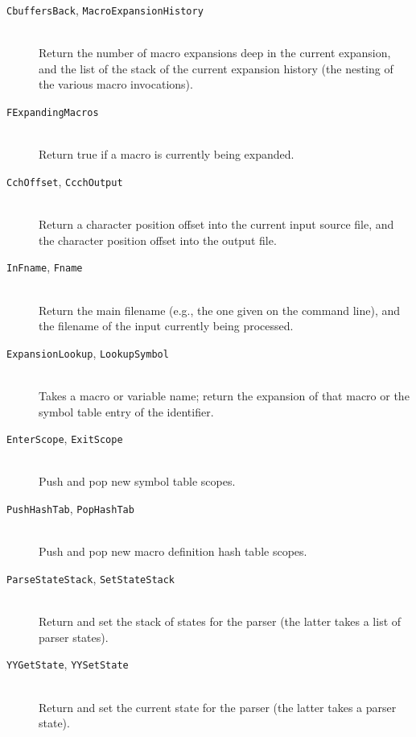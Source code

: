 \documentclass{article}
\newcommand{\eg}{e.g.,}
\begin{document}
\begin{description}
\item[\texttt{CbuffersBack}, \texttt{MacroExpansionHistory}] ~ \\
Return the number of macro expansions deep in the current expansion, and 
the list of the stack of the current expansion history (the nesting of
the various macro invocations).

\item[\texttt{FExpandingMacros}] ~ \\
Return true if a macro is currently being expanded.

\item[\texttt{CchOffset}, \texttt{CcchOutput}] ~ \\
Return a character position offset into the current input source file,
and the character position offset into the output file.

\item[\texttt{InFname}, \texttt{Fname}] ~ \\
Return the main filename (\eg{} the one given on the command line), and 
the filename of the input currently being processed.

\item[\texttt{ExpansionLookup}, \texttt{LookupSymbol}] ~ \\
Takes a macro or variable name; return the expansion of that macro or
the symbol table entry of the identifier.

\item[\texttt{EnterScope}, \texttt{ExitScope}] ~ \\
Push and pop new symbol table scopes.

\item[\texttt{PushHashTab}, \texttt{PopHashTab}] ~ \\
Push and pop new macro definition hash table scopes.

\item[\texttt{ParseStateStack}, \texttt{SetStateStack}] ~ \\
Return and set the stack of states for the parser (the latter takes a
list of parser states).

\item[\texttt{YYGetState}, \texttt{YYSetState}] ~ \\
Return and set the current state for the parser (the latter takes a
parser state).

\end{description}




%

\end{document}
